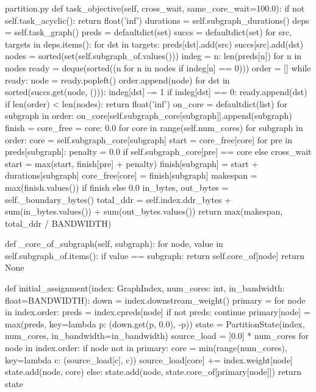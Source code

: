 \begin{Python}{partition.py}
    def task_objective(self, cross_wait, same_core_wait=100.0):
        if not self.task_acyclic():
            return float('inf')
        durations = self.subgraph_durations()
        deps = self.task_graph()
        preds = defaultdict(set)
        succs = defaultdict(set)
        for src, targets in deps.items():
            for dst in targets:
                preds[dst].add(src)
                succs[src].add(dst)
        nodes = sorted(set(self.subgraph_of.values()))
        indeg = {n: len(preds[n]) for n in nodes}
        ready = deque(sorted((n for n in nodes if indeg[n] == 0)))
        order = []
        while ready:
            node = ready.popleft()
            order.append(node)
            for dst in sorted(succs.get(node, ())):
                indeg[dst] -= 1
                if indeg[dst] == 0:
                    ready.append(dst)
        if len(order) < len(nodes):
            return float('inf')
        on_core = defaultdict(list)
        for subgraph in order:
            on_core[self.subgraph_core[subgraph]].append(subgraph)
        finish = {}
        core_free = {core: 0.0 for core in range(self.num_cores)}
        for subgraph in order:
            core = self.subgraph_core[subgraph]
            start = core_free[core]
            for pre in preds[subgraph]:
                penalty = 0.0 if self.subgraph_core[pre] == core else cross_wait
                start = max(start, finish[pre] + penalty)
            finish[subgraph] = start + durations[subgraph]
            core_free[core] = finish[subgraph]
        makespan = max(finish.values()) if finish else 0.0
        in_bytes, out_bytes = self._boundary_bytes()
        total_ddr = self.index.ddr_bytes + sum(in_bytes.values()) + sum(out_bytes.values())
        return max(makespan, total_ddr / BANDWIDTH)

    def _core_of_subgraph(self, subgraph):
        for node, value in self.subgraph_of.items():
            if value == subgraph:
                return self.core_of[node]
        return None

def initial_assignment(index: GraphIndex, num_cores: int, in_bandwidth: float=BANDWIDTH):
    down = index.downstream_weight()
    primary = {}
    for node in index.order:
        preds = index.cpreds[node]
        if not preds:
            continue
        primary[node] = max(preds, key=lambda p: (down.get(p, 0.0), -p))
    state = PartitionState(index, num_cores, in_bandwidth=in_bandwidth)
    source_load = [0.0] * num_cores
    for node in index.order:
        if node not in primary:
            core = min(range(num_cores), key=lambda c: (source_load[c], c))
            source_load[core] += index.weight[node]
            state.add(node, core)
        else:
            state.add(node, state.core_of[primary[node]])
    return state


\end{Python}
